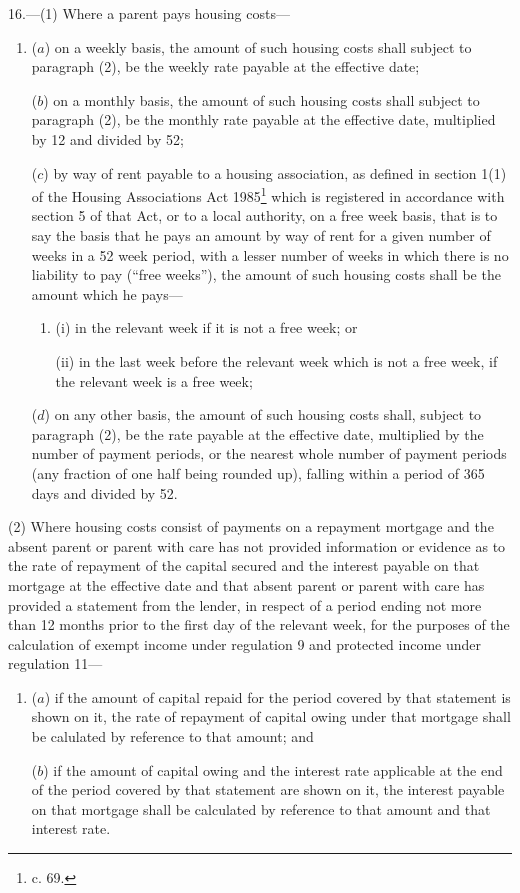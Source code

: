 \documentclass[a4paper]{article}
\begin{document}
16.—(1) Where a parent pays housing costs—
\begin{enumerate}\item[]
($a$) on a weekly basis, the amount of such housing costs shall subject to paragraph (2), be the weekly rate payable at the effective date;

($b$) on a monthly basis, the amount of such housing costs shall subject to paragraph (2), be the monthly rate payable at the effective date, multiplied by 12 and divided by 52;

($c$) by way of rent payable to a housing association, as defined in section 1(1) of the Housing Associations Act 1985\footnote{ c. 69.} which is registered in accordance with section 5 of that Act, or to a local authority, on a free week basis, that is to say the basis that he pays an amount by way of rent for a given number of weeks in a 52 week period, with a lesser number of weeks in which there is no liability to pay (“free weeks”), the amount of such housing costs shall be the amount which he pays—
\begin{enumerate}\item[]
(i) in the relevant week if it is not a free week; or

(ii) in the last week before the relevant week which is not a free week, if the relevant week is a free week;
\end{enumerate}

($d$) on any other basis, the amount of such housing costs shall, subject to paragraph (2), be the rate payable at the effective date, multiplied by the number of payment periods, or the nearest whole number of payment periods (any fraction of one half being rounded up), falling within a period of 365 days and divided by 52.
\end{enumerate}

(2) Where housing costs consist of payments on a repayment mortgage and the absent parent or parent with care has not provided information or evidence as to the rate of repayment of the capital secured and the interest payable on that mortgage at the effective date and that absent parent or parent with care has provided a statement from the lender, in respect of a period ending not more than 12 months prior to the first day of the relevant week, for the purposes of the calculation of exempt income under regulation 9 and protected income under regulation 11—
\begin{enumerate}\item[]
($a$) if the amount of capital repaid for the period covered by that statement is shown on it, the rate of repayment of capital owing under that mortgage shall be calulated by reference to that amount; and

($b$) if the amount of capital owing and the interest rate applicable at the end of the period covered by that statement are shown on it, the interest payable on that mortgage shall be calculated by reference to that amount and that interest rate.
\end{enumerate}
\end{document}
